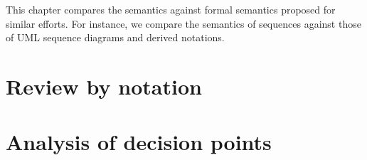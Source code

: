This chapter compares the \langname{} semantics against formal semantics
proposed for similar efforts.  For instance, we compare the semantics of
sequences against those of UML sequence diagrams and derived notations.

\section{Review by notation}\label{sec:semantics-comparison-review}


\section{Analysis of decision points}\label{sec:semantics-comparison-decisions}


